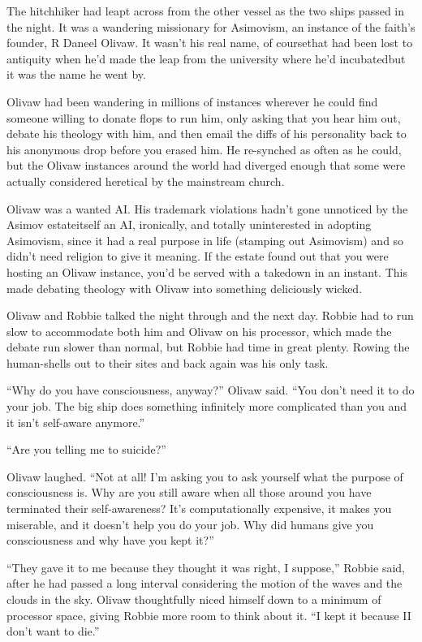 The hitchhiker had leapt across from the other vessel as the two
ships passed in the night. It was a wandering missionary for
Asimovism, an instance of the faith’s founder, R Daneel Olivaw. It
wasn’t his real name, of course\dash{}that had been lost to antiquity
when he’d made the leap from the university where he’d
incubated\dash{}but it was the name he went by.

Olivaw had been wandering in millions of instances wherever he
could find someone willing to donate flops to run him, only asking
that you hear him out, debate his theology with him, and then email
the diffs of his personality back to his anonymous drop before you
erased him. He re-synched as often as he could, but the Olivaw
instances around the world had diverged enough that some were
actually considered heretical by the mainstream church.

Olivaw was a wanted AI. His trademark violations hadn’t gone
unnoticed by the Asimov estate\dash{}itself an AI, ironically, and
totally uninterested in adopting Asimovism, since it had a real
purpose in life (stamping out Asimovism) and so didn’t need
religion to give it meaning. If the estate found out that you were
hosting an Olivaw instance, you’d be served with a takedown in an
instant. This made debating theology with Olivaw into something
deliciously wicked.

Olivaw and Robbie talked the night through and the next day. Robbie
had to run slow to accommodate both him and Olivaw on his
processor, which made the debate run slower than normal, but Robbie
had time in great plenty. Rowing the human-shells out to their
sites and back again was his only task.

“Why do you have consciousness, anyway?” Olivaw said. “You don’t
need it to do your job. The big ship does something infinitely more
complicated than you and it isn’t self-aware anymore.”

“Are you telling me to suicide?”

Olivaw laughed. “Not at all! I’m asking you to ask yourself what
the purpose of consciousness is. Why are you still aware when all
those around you have terminated their self-awareness? It’s
computationally expensive, it makes you miserable, and it doesn’t
help you do your job. Why did humans give you consciousness and why
have you kept it?”

“They gave it to me because they thought it was right, I suppose,”
Robbie said, after he had passed a long interval considering the
motion of the waves and the clouds in the sky. Olivaw thoughtfully
niced himself down to a minimum of processor space, giving Robbie
more room to think about it. “I kept it because I\dash{}I don’t want to
die.”

